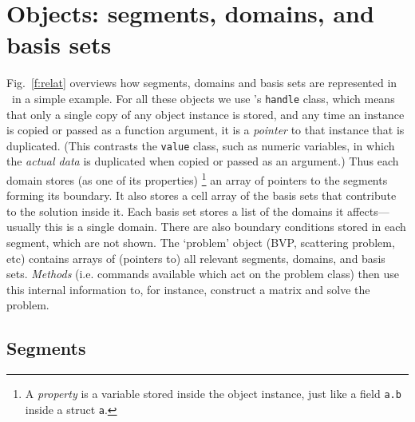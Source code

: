 \documentclass[12pt]{article}
\begin{document}
\section{Objects: segments, domains, and basis sets}

Fig.~\ref{f:relat} overviews how segments, domains and basis sets are
represented in \mpspack\ in a simple example.
For all these objects we use \matlab's {\tt handle} class,
which means that only a single copy of any object instance is
stored, and any time an instance is copied or passed as a function argument,
it is a {\em pointer} to that instance that is duplicated.
(This contrasts the {\tt value} class, such as numeric variables,
in which the {\em actual data} is duplicated when copied or passed as an
argument.)
Thus each domain stores (as one of its properties)%
  \footnote{A {\em property} is a variable stored inside the
    object instance, just like a field {\tt a.b} inside a struct {\tt a}.}
an array of pointers to the
segments forming its boundary.
It also stores a cell array of the basis sets that
contribute to the solution inside it.
Each basis set stores a list of the domains it affects---usually
this is a single domain.
There are also boundary conditions stored in
each segment, which are not shown.
The `problem' object (BVP, scattering problem, etc) contains arrays of
(pointers to) all relevant segments, domains, and basis sets.
{\em Methods} (i.e. commands available which act on the problem class)
then use this internal information to, for instance,
construct a matrix and solve the problem.

\subsection{Segments} %
\end{document}
